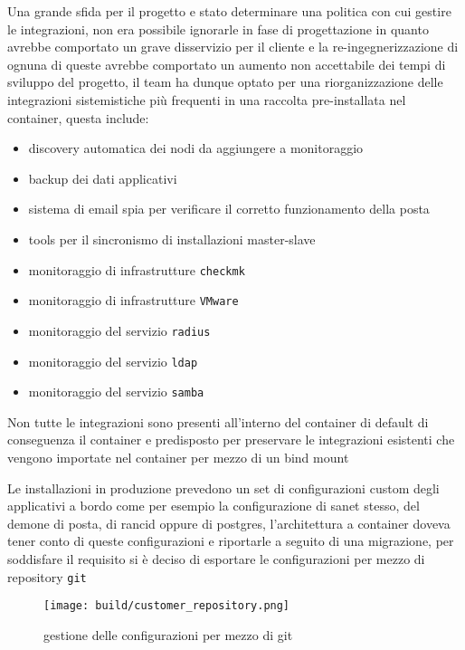 Una grande sfida per il progetto e stato determinare una politica con cui gestire le integrazioni, non era possibile ignorarle in fase di progettazione in quanto avrebbe comportato un grave disservizio per il cliente e la re-ingegnerizzazione di ognuna di queste avrebbe comportato un aumento non accettabile dei tempi di sviluppo del progetto, il team ha dunque optato per una riorganizzazione delle integrazioni sistemistiche più frequenti in una raccolta pre-installata nel container, questa include:

\begin{itemize}
  \item{discovery automatica dei nodi da aggiungere a monitoraggio}
  \item{backup dei dati applicativi}
  \item{sistema di email spia per verificare il corretto funzionamento della posta}
  \item{tools per il sincronismo di installazioni master-slave}
  \item{monitoraggio di infrastrutture \verb|checkmk|}
  \item{monitoraggio di infrastrutture \verb|VMware|}
  \item{monitoraggio del servizio \verb|radius| }
  \item{monitoraggio del servizio \verb|ldap| }
  \item{monitoraggio del servizio \verb|samba| }
\end{itemize}

Non tutte le integrazioni sono presenti all'interno del container di default di conseguenza il container e predisposto per preservare le integrazioni esistenti che vengono importate nel container per mezzo di un bind mount

Le installazioni in produzione prevedono un set di configurazioni custom degli applicativi a bordo come per esempio la configurazione di sanet stesso, del demone di posta, di rancid oppure di postgres, l'architettura a container doveva tener conto di queste configurazioni e riportarle a seguito di una migrazione, per soddisfare il requisito si è deciso di esportare le configurazioni per mezzo di repository \verb|git|

\begin{figure}[H]
    \centering
    \texttt{[image: build/customer\_repository.png]}
    \caption{gestione delle configurazioni per mezzo di git}
    \label{fig:customer_repository}
\end{figure}

